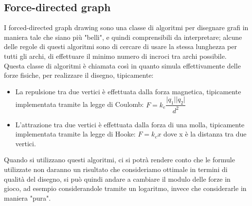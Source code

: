 \documentclass[12pt,a4paper]{article}
\begin{document}
\subsection{Force-directed graph}
I forced-directed graph drawing sono una classe di algoritmi per disegnare grafi in maniera tale che siano più "belli", e quindi comprensibili da interpretare; alcune delle regole di questi algoritmi sono di cercare di usare la stessa lunghezza per tutti gli archi, di effettuare il minimo numero di incroci tra archi possibile. Questa classe di algoritmi è chiamata così in quanto simula effettivamente delle forze fisiche, per realizzare il disegno, tipicamente:
\begin{itemize}
\item La repulsione tra due vertici è effettuata dalla forza magnetica, tipicamente implementata tramite la legge di Coulomb: $F = k_e \dfrac{ \vert q_1 \vert \vert q_2 \vert }{d^2}$
\item L'attrazione tra due vertici è effettuata dalla forza di una molla, tipicamente implementata tramite la legge di Hooke: $F = k_c x $ dove x è la distanza tra due vertici.
\end{itemize}
Quando si utilizzano questi algoritmi, ci si potrà rendere conto che le formule utilizzate non daranno un risultato che consideriamo ottimale in termini di qualità del disegno, si può quindi andare a cambiare il modulo delle forze in gioco, ad esempio considerandole tramite un logaritmo, invece che considerarle in maniera "pura".
\end{document}
